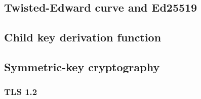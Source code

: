 \subsection{Twisted-Edward curve and Ed25519}

\subsection{Child key derivation function}

\subsection{Symmetric-key cryptography}
\label{sec: Symmetric_keys}

\subsubsection{TLS 1.2}


